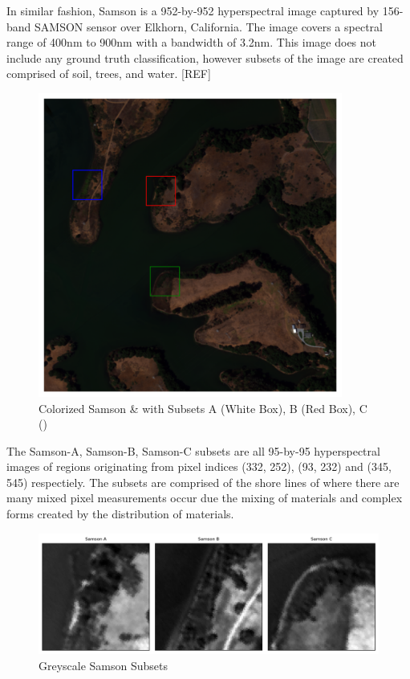 In similar fashion, Samson is a 952-by-952 hyperspectral image captured by 156-band SAMSON sensor over Elkhorn, California. The image covers a spectral range of 400nm to 900nm with a bandwidth of 3.2nm. This image does not include any ground truth classification, however subsets of the image are created comprised of soil, trees, and water. [REF]
\begin{figure}[H]
  \centering
  \includegraphics[width=10cm]{samson_full.png}  %
  \caption{Colorized Samson \& with Subsets A (White Box), B (Red Box), C ()}
  \label{samson}  %
\end{figure}

The Samson-A, Samson-B, Samson-C subsets are all 95-by-95 hyperspectral images of regions originating from pixel indices (332, 252), (93, 232) and (345, 545) respectiely. The subsets are comprised of the shore lines of where there are many mixed pixel measurements occur due the mixing of materials and complex forms created by the distribution of materials.
\begin{figure}[H]
  \centering
  \includegraphics[width=15cm]{samsonabc.png}  %
  \caption{Greyscale Samson Subsets}
  \label{samsonabc}  %
\end{figure}


